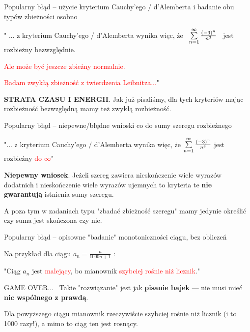 \begin{blad}{Popularny błąd -- użycie kryterium Cauchy'ego / d'Alemberta i badanie obu typów zbieżności osobno}

" ... z kryterium Cauchy'ego / d'Alemberta wynika więc, że \ $ \sum\limits_{n = 1}^{\infty} \frac{(-3)^n}{n^3} $ \ jest rozbieżny bezwzględnie.

\textcolor{red}{Ale może być jeszcze zbieżny normalnie. }

\textcolor{red}{Badam zwykłą zbieżność z twierdzenia Leibnitza...}"
\bigskip

\textbf{STRATA CZASU I ENERGII}. Jak już pisaliśmy, dla tych kryteriów mając rozbieżność bezwzględną mamy też zwykłą rozbieżność.
\end{blad}

\begin{blad}{Popularny błąd -- niepewne/błędne wnioski co do sumy szeregu rozbieżnego} 

"... z kryterium Cauchy'ego / d'Alemberta wynika więc, że $ \sum\limits_{n = 1}^{\infty} \frac{(-3)^n}{n^3} $ jest rozbieżny \textcolor{red}{do $\infty$}"

\textbf{Niepewny wniosek}. Jeżeli szereg zawiera nieskończenie wiele wyrazów dodatnich i nieskończenie wiele wyrazów ujemnych to kryteria te
\textbf{nie gwarantują} istnienia sumy szeregu.

A poza tym w zadaniach typu "zbadać zbieżność szeregu" mamy jedynie określić czy suma jest skończona czy nie.
\end{blad}

\begin{blad}{Popularny błąd -- opisowne "badanie" monotoniczności ciągu, bez obliczeń}

Na przykład dla ciągu $ a_n = \frac{n}{1000n + 1} $ :

"Ciąg $a_n$ jest \textcolor{red}{malejący}, bo mianownik \textcolor{red}{szybciej rośnie niż licznik}."

GAME OVER... \ Takie "rozwiązanie" jest jak \textbf{pisanie bajek} --- nie musi mieć \linebreak
\textbf{nic wspólnego z prawdą}.

Dla powyższego ciągu mianownik rzeczywiście szybciej rośnie niż licznik (i to 1000 razy!), a mimo to ciąg ten jest rosnący.
\end{blad}

